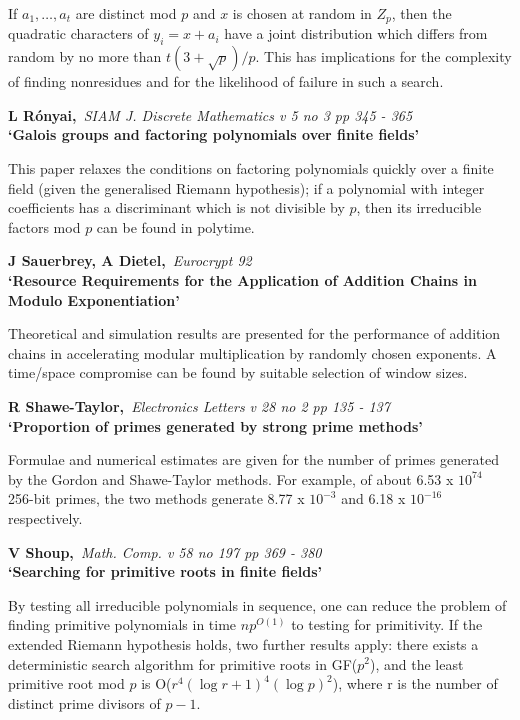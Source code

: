 If $a_1, \ldots, a_t$ are distinct mod $p$ and $x$ is chosen at random in
$Z_p$, then the quadratic characters of $y_i = x + a_i$ have a joint 
distribution which differs from random by no more than $t(3+\sqrt{p})/p$.
This has implications for the complexity of finding nonresidues and for the
likelihood of failure in such a search.

{\bf \noindent L R\'onyai,}{\em ~SIAM J. Discrete Mathematics v 5 no 3 pp 345 
- 365\\}
{\bf `Galois groups and factoring polynomials over finite fields'}

This paper relaxes the conditions on factoring polynomials quickly over a 
finite field (given the generalised Riemann hypothesis); if a polynomial
with integer coefficients has a discriminant which is not divisible by $p$, 
then its irreducible factors mod $p$ can be found in polytime.

{\bf \noindent J Sauerbrey, A Dietel,}{\em ~Eurocrypt 92\\}
{\bf `Resource Requirements for the Application of Addition Chains in
Modulo Exponentiation'}

Theoretical and simulation results are presented for the performance
of addition chains in accelerating modular multiplication by randomly
chosen exponents. A time/space compromise can be found by suitable
selection of window sizes.

\pagebreak

{\bf \noindent R Shawe-Taylor,}{\em ~Electronics Letters v 28 no 2 pp 135 
- 137\\}
{\bf `Proportion of primes generated by strong prime methods'}

Formulae and numerical estimates are given for the number of primes generated
by the Gordon and Shawe-Taylor methods. For example, of about 6.53 x $10^{74}$ 
256-bit primes, the two methods generate 8.77 x $10^{-3}$ and 6.18 x $10^{-16}$
respectively.

{\bf \noindent V Shoup,}{\em ~Math. Comp. v 58 no 197 pp 369 - 380\\}
{\bf `Searching for primitive roots in finite fields'}

By testing all irreducible polynomials in sequence, one can reduce the problem
of finding primitive polynomials in time $np^{O(1)}$ to testing for
primitivity. If the extended Riemann hypothesis holds, two further results 
apply: there exists a deterministic search algorithm for primitive roots in
GF($p^2$), and the least primitive root mod $p$ is O($r^4(\log{r+1})^4
(\log{p})^2$), where r is the number of distinct prime divisors of $p-1$.

